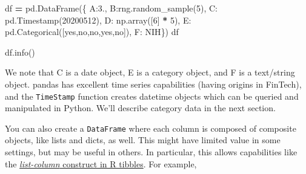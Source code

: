 \documentclass[
  letterpaper,
]{scrbook}
\newenvironment{Shaded}{\begin{snugshade}}{\end{snugshade}}
\newcommand{\DecValTok}[1]{\textcolor[rgb]{0.00,0.00,0.81}{#1}}
\newcommand{\FloatTok}[1]{\textcolor[rgb]{0.00,0.00,0.81}{#1}}
\newcommand{\NormalTok}[1]{#1}
\newcommand{\OperatorTok}[1]{\textcolor[rgb]{0.81,0.36,0.00}{\textbf{#1}}}
\newcommand{\StringTok}[1]{\textcolor[rgb]{0.31,0.60,0.02}{#1}}
\begin{document}
\begin{Shaded}
\begin{Highlighting}[]
\NormalTok{df }\OperatorTok{=}\NormalTok{ pd.DataFrame(\{}
    \StringTok{\textquotesingle{}A\textquotesingle{}}\NormalTok{:}\FloatTok{3.}\NormalTok{,}
    \StringTok{\textquotesingle{}B\textquotesingle{}}\NormalTok{:rng.random\_sample(}\DecValTok{5}\NormalTok{),}
    \StringTok{\textquotesingle{}C\textquotesingle{}}\NormalTok{: pd.Timestamp(}\StringTok{\textquotesingle{}20200512\textquotesingle{}}\NormalTok{),}
    \StringTok{\textquotesingle{}D\textquotesingle{}}\NormalTok{: np.array([}\DecValTok{6}\NormalTok{] }\OperatorTok{*} \DecValTok{5}\NormalTok{),}
    \StringTok{\textquotesingle{}E\textquotesingle{}}\NormalTok{: pd.Categorical([}\StringTok{\textquotesingle{}yes\textquotesingle{}}\NormalTok{,}\StringTok{\textquotesingle{}no\textquotesingle{}}\NormalTok{,}\StringTok{\textquotesingle{}no\textquotesingle{}}\NormalTok{,}\StringTok{\textquotesingle{}yes\textquotesingle{}}\NormalTok{,}\StringTok{\textquotesingle{}no\textquotesingle{}}\NormalTok{]),}
    \StringTok{\textquotesingle{}F\textquotesingle{}}\NormalTok{: }\StringTok{\textquotesingle{}NIH\textquotesingle{}}\NormalTok{\})}
\NormalTok{df}
\end{Highlighting}
\end{Shaded}

\begin{Shaded}
\begin{Highlighting}[]
\NormalTok{df.info()}
\end{Highlighting}
\end{Shaded}

We note that C is a date object, E is a category object, and F is a text/string object. pandas has excellent time series capabilities (having origins in FinTech), and the \texttt{TimeStamp} function creates datetime objects which can be queried and manipulated in Python. We'll describe category data in the next section.

You can also create a \texttt{DataFrame} where each column is composed of composite objects, like lists and dicts, as well. This might have limited value in some settings, but may be useful in others. In particular, this allows capabilities like the \href{https://jennybc.github.io/purrr-tutorial/ls13_list-columns.html}{\emph{list-column} construct in R tibbles}. For example,
\end{document}
